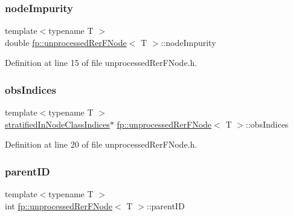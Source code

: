 \subsubsection{\texorpdfstring{node\+Impurity}{nodeImpurity}}
{\footnotesize\ttfamily template$<$typename T $>$ \\
double \hyperlink{classfp_1_1unprocessedRerFNode}{fp\+::unprocessed\+Rer\+F\+Node}$<$ T $>$\+::node\+Impurity\hspace{0.3cm}{\ttfamily [protected]}}



Definition at line 15 of file unprocessed\+Rer\+F\+Node.\+h.

\mbox{\label{classfp_1_1unprocessedRerFNode_ad52d9d508bf378bc793b8cf961163735}} 
\subsubsection{\texorpdfstring{obs\+Indices}{obsIndices}}
{\footnotesize\ttfamily template$<$typename T $>$ \\
\hyperlink{classfp_1_1stratifiedInNodeClassIndices}{stratified\+In\+Node\+Class\+Indices}$\ast$ \hyperlink{classfp_1_1unprocessedRerFNode}{fp\+::unprocessed\+Rer\+F\+Node}$<$ T $>$\+::obs\+Indices\hspace{0.3cm}{\ttfamily [protected]}}



Definition at line 20 of file unprocessed\+Rer\+F\+Node.\+h.

\mbox{\label{classfp_1_1unprocessedRerFNode_ab87cfcf5df700dbc7ec02c87057b27aa}} 
\subsubsection{\texorpdfstring{parent\+ID}{parentID}}
{\footnotesize\ttfamily template$<$typename T $>$ \\
int \hyperlink{classfp_1_1unprocessedRerFNode}{fp\+::unprocessed\+Rer\+F\+Node}$<$ T $>$\+::parent\+ID\hspace{0.3cm}{\ttfamily [protected]}}



